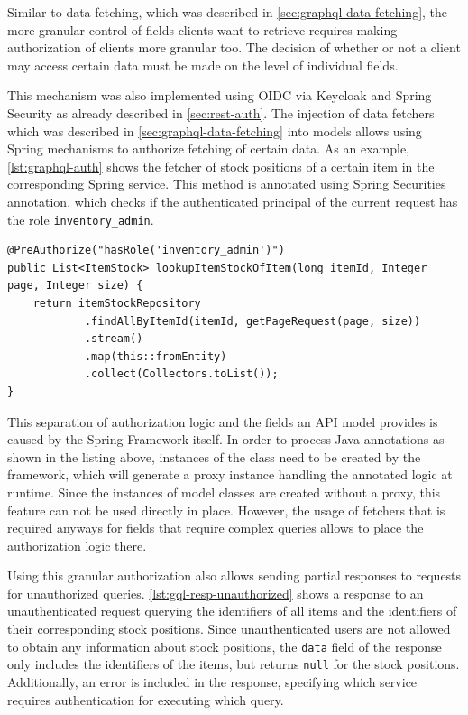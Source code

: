 Similar to data fetching, which was described in \autoref{sec:graphql-data-fetching}, the more granular control of fields clients want to retrieve requires making authorization of clients more granular too.
The decision of whether or not a client may access certain data must be made on the level of individual fields.

This mechanism was also implemented using \ac{OIDC} via Keycloak and Spring Security as already described in \autoref{sec:rest-auth}.
The injection of data fetchers which was described in \autoref{sec:graphql-data-fetching} into models allows using Spring mechanisms to authorize fetching of certain data.
As an example, \autoref{lst:graphql-auth} shows the fetcher of stock positions of a certain item in the corresponding Spring service.
This method is annotated using Spring Securities annotation, which checks if the authenticated principal of the current request has the role \texttt{inventory\_admin}.

\begin{lstlisting}[caption={Authorization for Retrieval of Individual Fields}, style=java-ext, label={lst:graphql-auth}]
@PreAuthorize("hasRole('inventory_admin')")
public List<ItemStock> lookupItemStockOfItem(long itemId, Integer page, Integer size) {
    return itemStockRepository
            .findAllByItemId(itemId, getPageRequest(page, size))
            .stream()
            .map(this::fromEntity)
            .collect(Collectors.toList());
}
\end{lstlisting}

This separation of authorization logic and the fields an \ac{API} model provides is caused by the Spring Framework itself.
In order to process Java annotations as shown in the listing above, instances of the class need to be created by the framework, which will generate a proxy instance handling the annotated logic at runtime.
Since the instances of model classes are created without a proxy, this feature can not be used directly in place.
However, the usage of fetchers that is required anyways for fields that require complex queries allows to place the authorization logic there.

Using this granular authorization also allows sending partial responses to requests for unauthorized queries.
\autoref{lst:gql-resp-unauthorized} shows a response to an unauthenticated request querying the identifiers of all items and the identifiers of their corresponding stock positions.
Since unauthenticated users are not allowed to obtain any information about stock positions, the \texttt{data} field of the response only includes the identifiers of the items, but returns \texttt{null} for the stock positions.
Additionally, an error is included in the response, specifying which service requires authentication for executing which query.

